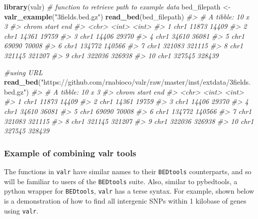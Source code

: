 \documentclass[9pt,a4paper]{extarticle}
\renewcommand{\KeywordTok}[1]{\textbf{{#1}}}
\renewcommand{\StringTok}[1]{\textcolor[rgb]{0.87,0.00,0.00}{{#1}}}
\renewcommand{\CommentTok}[1]{\textcolor[rgb]{0.50,0.50,0.50}{\textit{{#1}}}}
\renewcommand{\NormalTok}[1]{{#1}}
\begin{document}
\begin{Highlighting}[]
\KeywordTok{library}\NormalTok{(valr)}
\CommentTok{# function to retrieve path to example data}
\NormalTok{bed_filepath <-}\StringTok{ }\KeywordTok{valr_example}\NormalTok{(}\StringTok{"3fields.bed.gz"}\NormalTok{) }
\KeywordTok{read_bed}\NormalTok{(bed_filepath) }
\CommentTok{#> # A tibble: 10 x 3}
\CommentTok{#>    chrom  start    end}
\CommentTok{#>    <chr>  <int>  <int>}
\CommentTok{#>  1  chr1  11873  14409}
\CommentTok{#>  2  chr1  14361  19759}
\CommentTok{#>  3  chr1  14406  29370}
\CommentTok{#>  4  chr1  34610  36081}
\CommentTok{#>  5  chr1  69090  70008}
\CommentTok{#>  6  chr1 134772 140566}
\CommentTok{#>  7  chr1 321083 321115}
\CommentTok{#>  8  chr1 321145 321207}
\CommentTok{#>  9  chr1 322036 326938}
\CommentTok{#> 10  chr1 327545 328439}

\CommentTok{#using URL}
\KeywordTok{read_bed}\NormalTok{(}\StringTok{"https://github.com/rnabioco/valr/raw/master/inst/extdata/3fields.bed.gz"}\NormalTok{)}
\CommentTok{#> # A tibble: 10 x 3}
\CommentTok{#>    chrom  start    end}
\CommentTok{#>    <chr>  <int>  <int>}
\CommentTok{#>  1  chr1  11873  14409}
\CommentTok{#>  2  chr1  14361  19759}
\CommentTok{#>  3  chr1  14406  29370}
\CommentTok{#>  4  chr1  34610  36081}
\CommentTok{#>  5  chr1  69090  70008}
\CommentTok{#>  6  chr1 134772 140566}
\CommentTok{#>  7  chr1 321083 321115}
\CommentTok{#>  8  chr1 321145 321207}
\CommentTok{#>  9  chr1 322036 326938}
\CommentTok{#> 10  chr1 327545 328439}
\end{Highlighting}


\subsubsection*{Example of combining valr tools}

The functions in \texttt{valr} have similar names to their \texttt{BEDtools} counterparts, and so will be familiar to users of the \texttt{BEDtools} suite. Also, similar to pybedtools\cite{dale_pybedtools:_2011}, a python wrapper for \texttt{BEDtools}, \texttt{valr} has a terse syntax. For example, shown below is a demonstration of how to find all intergenic SNPs within 1 kilobase of genes using \texttt{valr}.
\end{document}
